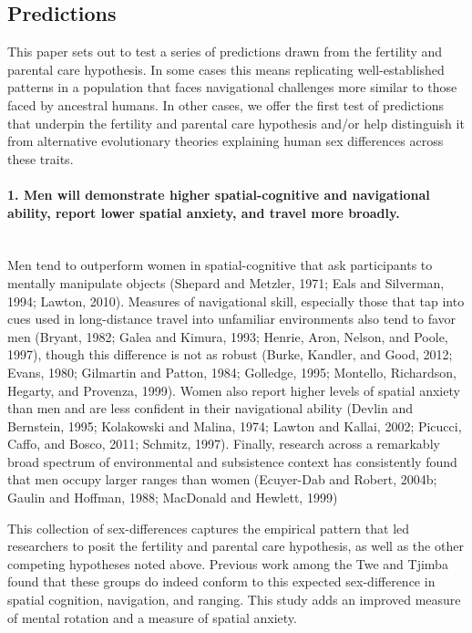	\subsection{Predictions}
	\label{sec:1.2}
This paper sets out to test a series of predictions drawn from the fertility and parental care hypothesis.  In some cases this means replicating well-established patterns in a population that faces navigational challenges more similar to those faced by ancestral humans.  In other cases, we offer the first test of predictions that underpin the fertility and parental care hypothesis and/or help distinguish it from alternative evolutionary theories explaining human sex differences across these traits.	
	
\paragraph{1. Men will demonstrate higher spatial-cognitive and navigational ability, report lower spatial anxiety, and travel more broadly.}\mbox{}\\

Men tend to outperform women in spatial-cognitive that ask participants to mentally manipulate objects \cite{sanders1982sex} (Shepard and Metzler, 1971; Eals and Silverman, 1994; Lawton, 2010). Measures of navigational skill, especially those that tap into cues used in long-distance travel into unfamiliar environments also tend to favor men \cite{moffat1998navigation} (Bryant, 1982; Galea and Kimura, 1993; Henrie, Aron, Nelson, and Poole, 1997), though this difference is not as robust (Burke, Kandler, and Good, 2012; Evans, 1980; Gilmartin and Patton, 1984; Golledge, 1995; Montello, Richardson, Hegarty, and Provenza, 1999).  Women also report higher levels of spatial anxiety than men and are less confident in their navigational ability (Devlin and Bernstein, 1995; Kolakowski and Malina, 1974; Lawton and Kallai, 2002; Picucci, Caffo, and Bosco, 2011; Schmitz, 1997).  Finally, research across a remarkably broad spectrum of environmental and subsistence context has consistently found that men occupy larger ranges than women (Ecuyer-Dab and Robert, 2004b; Gaulin and Hoffman, 1988; MacDonald and Hewlett, 1999)

This collection of sex-differences captures the empirical pattern that led researchers to posit the fertility and parental care hypothesis, as well as the other competing hypotheses noted above.  Previous work among the Twe and Tjimba found that these groups do indeed conform to this expected sex-difference in spatial cognition, navigation, and ranging.  This study adds an improved measure of mental rotation and a measure of spatial anxiety.

